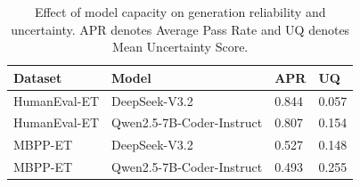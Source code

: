 \begin{table}[t]
\vspace{0.5em}
\centering
\caption{Effect of model capacity on generation reliability and uncertainty. APR denotes Average Pass Rate and UQ denotes Mean Uncertainty Score.}
\label{tab:model_selection}
\footnotesize
\setlength{\tabcolsep}{4pt}
\begin{tabular*}{\columnwidth}{@{\extracolsep{\fill}}llll@{}}
\hline
Dataset & Model & APR & UQ \\
\hline
HumanEval-ET & DeepSeek-V3.2 & 0.844 & 0.057 \\
HumanEval-ET & Qwen2.5-7B-Coder-Instruct & 0.807 & 0.154 \\
MBPP-ET & DeepSeek-V3.2 & 0.527 & 0.148 \\
MBPP-ET & Qwen2.5-7B-Coder-Instruct & 0.493 & 0.255 \\
\hline
\end{tabular*}
\end{table}